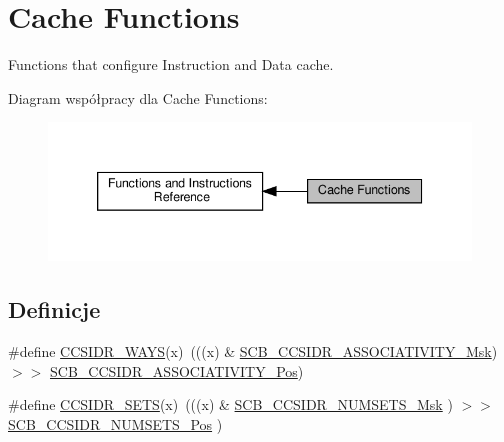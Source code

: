 \hypertarget{group___c_m_s_i_s___core___cache_functions}{}\section{Cache Functions}
\label{group___c_m_s_i_s___core___cache_functions}


Functions that configure Instruction and Data cache.  


Diagram współpracy dla Cache Functions\+:\nopagebreak
\begin{figure}[H]
\begin{center}
\leavevmode
\includegraphics[width=339pt]{group___c_m_s_i_s___core___cache_functions}
\end{center}
\end{figure}
\subsection*{Definicje}
\begin{DoxyCompactItemize}
\item 
\#define \hyperlink{group___c_m_s_i_s___core___cache_functions_ga3d672529cd193537fe2a0141931c6ad9}{C\+C\+S\+I\+D\+R\+\_\+\+W\+A\+YS}(x)~(((x) \& \hyperlink{group___c_m_s_i_s___s_c_b_gae093c4c635dad43845967512fa87173a}{S\+C\+B\+\_\+\+C\+C\+S\+I\+D\+R\+\_\+\+A\+S\+S\+O\+C\+I\+A\+T\+I\+V\+I\+T\+Y\+\_\+\+Msk}) $>$$>$ \hyperlink{group___c_m_s_i_s___s_c_b_gae67f2f83976b819fb3039fc35cfef0fb}{S\+C\+B\+\_\+\+C\+C\+S\+I\+D\+R\+\_\+\+A\+S\+S\+O\+C\+I\+A\+T\+I\+V\+I\+T\+Y\+\_\+\+Pos})
\item 
\#define \hyperlink{group___c_m_s_i_s___core___cache_functions_gaf20feee7c52fee32b48ee0d2ceaaf932}{C\+C\+S\+I\+D\+R\+\_\+\+S\+E\+TS}(x)~(((x) \& \hyperlink{group___c_m_s_i_s___s_c_b_ga47d1f01185d7a039334031008386c5a8}{S\+C\+B\+\_\+\+C\+C\+S\+I\+D\+R\+\_\+\+N\+U\+M\+S\+E\+T\+S\+\_\+\+Msk}      ) $>$$>$ \hyperlink{group___c_m_s_i_s___s_c_b_ga1028d2c238f74d2aa021f53ffbe8d7ab}{S\+C\+B\+\_\+\+C\+C\+S\+I\+D\+R\+\_\+\+N\+U\+M\+S\+E\+T\+S\+\_\+\+Pos}      )
\end{DoxyCompactItemize}
